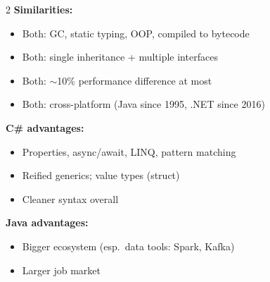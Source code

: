 \documentclass[11pt, letterpaper]{article}
\begin{document}
\begin{tcolorbox}[colback=partbg, colframe=sectionblue,
  title={\bfseries Java vs C\#}, arc=3pt, boxrule=1pt]
\footnotesize
\begin{multicols}{2}
\textbf{Similarities:}
\begin{itemize}[noitemsep, leftmargin=*]
  \item Both: GC, static typing, OOP, compiled to bytecode
  \item Both: single inheritance + multiple interfaces
  \item Both: $\sim$10\% performance difference at most
  \item Both: cross-platform (Java since 1995, .NET since 2016)
\end{itemize}
\columnbreak
\textbf{C\# advantages:}
\begin{itemize}[noitemsep, leftmargin=*]
  \item Properties, async/await, LINQ, pattern matching
  \item Reified generics; value types (struct)
  \item Cleaner syntax overall
\end{itemize}
\textbf{Java advantages:}
\begin{itemize}[noitemsep, leftmargin=*]
  \item Bigger ecosystem (esp.\ data tools: Spark, Kafka)
  \item Larger job market
\end{itemize}
\end{multicols}
\end{tcolorbox}

\vspace{4pt}
\end{document}
